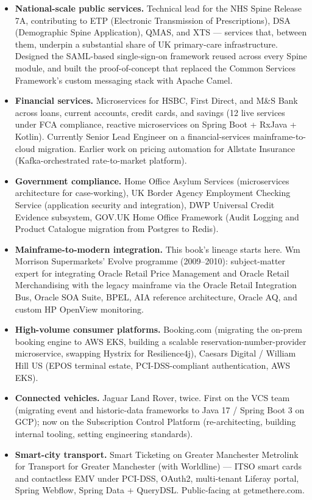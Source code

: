 \documentclass[
  11pt,
  british,
  oneside]{book}
\begin{document}
\begin{itemize}
\item
  \textbf{National-scale public services.} Technical lead for the NHS
  Spine Release 7A, contributing to ETP (Electronic Transmission of
  Prescriptions), DSA (Demographic Spine Application), QMAS, and XTS ---
  services that, between them, underpin a substantial share of UK
  primary-care infrastructure. Designed the SAML-based single-sign-on
  framework reused across every Spine module, and built the
  proof-of-concept that replaced the Common Services Framework's custom
  messaging stack with Apache Camel.
\item
  \textbf{Financial services.} Microservices for HSBC, First Direct, and
  M\&S Bank across loans, current accounts, credit cards, and savings
  (12 live services under FCA compliance, reactive microservices on
  Spring Boot + RxJava + Kotlin). Currently Senior Lead Engineer on a
  financial-services mainframe-to-cloud migration. Earlier work on
  pricing automation for Allstate Insurance (Kafka-orchestrated
  rate-to-market platform).
\item
  \textbf{Government compliance.} Home Office Asylum Services
  (microservices architecture for case-working), UK Border Agency
  Employment Checking Service (application security and integration),
  DWP Universal Credit Evidence subsystem, GOV.UK Home Office Framework
  (Audit Logging and Product Catalogue migration from Postgres to
  Redis).
\item
  \textbf{Mainframe-to-modern integration.} This book's lineage starts
  here. Wm Morrison Supermarkets' Evolve programme (2009--2010):
  subject-matter expert for integrating Oracle Retail Price Management
  and Oracle Retail Merchandising with the legacy mainframe via the
  Oracle Retail Integration Bus, Oracle SOA Suite, BPEL, AIA reference
  architecture, Oracle AQ, and custom HP OpenView monitoring.
\item
  \textbf{High-volume consumer platforms.} Booking.com (migrating the
  on-prem booking engine to AWS EKS, building a scalable
  reservation-number-provider microservice, swapping Hystrix for
  Resilience4j), Caesars Digital / William Hill US (EPOS terminal
  estate, PCI-DSS-compliant authentication, AWS EKS).
\item
  \textbf{Connected vehicles.} Jaguar Land Rover, twice. First on the
  VCS team (migrating event and historic-data frameworks to Java 17 /
  Spring Boot 3 on GCP); now on the Subscription Control Platform
  (re-architecting, building internal tooling, setting engineering
  standards).
\item
  \textbf{Smart-city transport.} Smart Ticketing on Greater Manchester
  Metrolink for Transport for Greater Manchester (with Worldline) ---
  ITSO smart cards and contactless EMV under PCI-DSS, OAuth2,
  multi-tenant Liferay portal, Spring Webflow, Spring Data + QueryDSL.
  Public-facing at getmethere.com.
\end{itemize}
\end{document}
